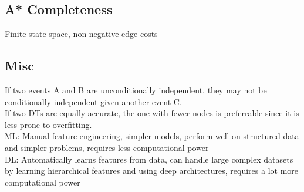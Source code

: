 \documentclass[8pt,landscape,a4paper]{article}
\begin{document}
\begin{multicols*}{3}
\subsection{A* Completeness}
Finite state space, non-negative edge costs

\subsection{Misc}
If two events A and B are unconditionally independent, they may not be conditionally independent given another event C.\\

If two DTs are equally accurate, the one with fewer nodes is preferrable since it is less prone to overfitting.\\

ML: Manual feature engineering, simpler models, perform well on structured data and simpler problems, requires less computational power\\

DL: Automatically learns features from data, can handle large complex datasets by learning hierarchical features and using deep architectures, requires a lot more computational power
\end{multicols*}
\end{document}

